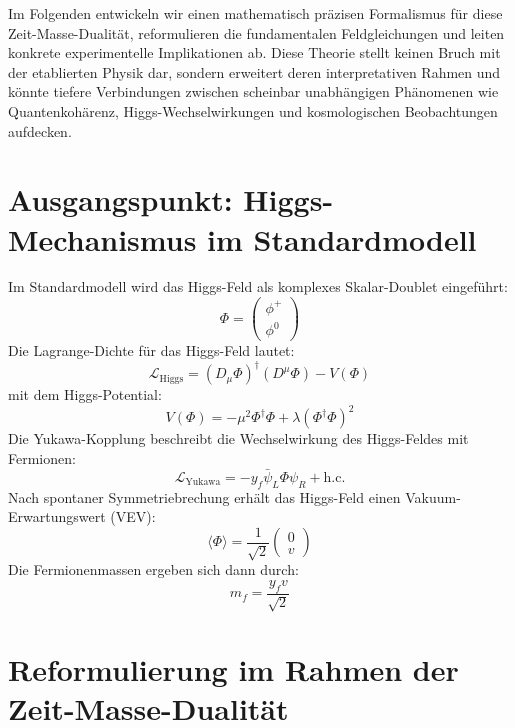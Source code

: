 \documentclass[a4paper,12pt]{article}
\begin{document}
	Im Folgenden entwickeln wir einen mathematisch präzisen Formalismus für diese Zeit-Masse-Dualität, reformulieren die fundamentalen Feldgleichungen und leiten konkrete experimentelle Implikationen ab. Diese Theorie stellt keinen Bruch mit der etablierten Physik dar, sondern erweitert deren interpretativen Rahmen und könnte tiefere Verbindungen zwischen scheinbar unabhängigen Phänomenen wie Quantenkohärenz, Higgs-Wechselwirkungen und kosmologischen Beobachtungen aufdecken.
	
	\section{Ausgangspunkt: Higgs-Mechanismus im Standardmodell}
	Im Standardmodell wird das Higgs-Feld als komplexes Skalar-Doublet eingeführt:
	\begin{equation}
		\Phi = \begin{pmatrix} \phi^+ \\ \phi^0 \end{pmatrix}
	\end{equation}
	Die Lagrange-Dichte für das Higgs-Feld lautet:
	\begin{equation}
		\mathcal{L}_{\text{Higgs}} = (D_\mu \Phi)^\dagger (D^\mu \Phi) - V(\Phi)
	\end{equation}
	mit dem Higgs-Potential:
	\begin{equation}
		V(\Phi) = -\mu^2 \Phi^\dagger \Phi + \lambda (\Phi^\dagger \Phi)^2
	\end{equation}
	Die Yukawa-Kopplung beschreibt die Wechselwirkung des Higgs-Feldes mit Fermionen:
	\begin{equation}
		\mathcal{L}_{\text{Yukawa}} = -y_f \bar{\psi}_L \Phi \psi_R + \text{h.c.}
	\end{equation}
	Nach spontaner Symmetriebrechung erhält das Higgs-Feld einen Vakuum-Erwartungswert (VEV):
	\begin{equation}
		\langle \Phi \rangle = \frac{1}{\sqrt{2}} \begin{pmatrix} 0 \\ v \end{pmatrix}
	\end{equation}
	Die Fermionenmassen ergeben sich dann durch:
	\begin{equation}
		m_f = \frac{y_f v}{\sqrt{2}}
	\end{equation}
	
	\section{Reformulierung im Rahmen der Zeit-Masse-Dualität}
\end{document}
